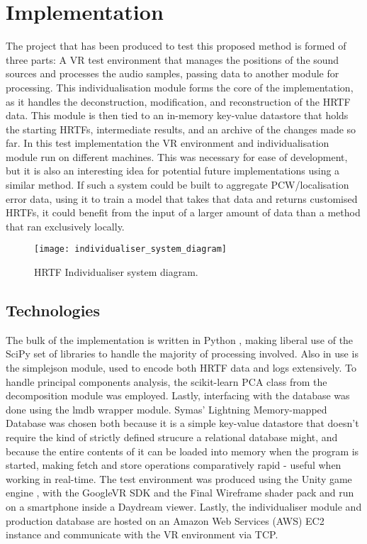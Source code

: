 \section{Implementation}
The project that has been produced to test this proposed method is formed of three parts: A VR test environment that manages the positions of the sound sources and processes the audio samples, passing data to another module for processing. This individualisation module forms the core of the implementation, as it handles the deconstruction, modification, and reconstruction of the HRTF data. This module is then tied to an in-memory key-value datastore that holds the starting HRTFs, intermediate results, and an archive of the changes made so far. In this test implementation the VR environment and individualisation module run on different machines. This was necessary for ease of development, but it is also an interesting idea for potential future implementations using a similar method. If such a system could be built to aggregate PCW/localisation error data, using it to train a model that takes that data and returns customised HRTFs, it could benefit from the input of a larger amount of data than a method that ran exclusively locally. 

\begin{figure}
	\caption{HRTF Individualiser system diagram. }
	\centering
		\texttt{[image: individualiser\_system\_diagram]}
	
\end{figure}

\subsection{Technologies}
The bulk of the implementation is written in Python \citep{GuidovanRossum}, making liberal use of the SciPy\citep{Jones2001} set of libraries to handle the majority of processing involved. Also in use is the simplejson\citep{Ippolito2017} module, used to encode both HRTF data and logs extensively. To handle principal components analysis, the scikit-learn\citep{scikit-learn} PCA class from the decomposition module was employed. Lastly, interfacing with the database was done using the lmdb wrapper module\citep{lmdbpython}. Symas' Lightning Memory-mapped Database \citep{openldap} was chosen both because it is a simple key-value datastore that doesn't require the kind of strictly defined strucure a relational database might, and because the entire contents of it can be loaded into memory when the program is started, making fetch and store operations comparatively rapid - useful when working in real-time. The test environment was produced using the Unity game engine \citep{engine9unity}, with the GoogleVR SDK \citep{DevelopersGoogle2016} and the Final Wireframe \citep{finalwireframe} shader pack and run on a smartphone inside a Daydream\citep{Google2016} viewer. Lastly, the individualiser module and production database are hosted on an Amazon Web Services (AWS) EC2 instance and communicate with the VR environment via TCP.

